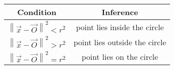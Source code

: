 \providecommand{\norm}[1]{\left\lVert#1\right\rVert}

\begin{tabular}[]{|c|c|}
\hline
Condition	&Inference		\\\hline
$\norm{\vec{x}-\vec{O}}^2<r^2$	&point lies inside the circle \\ \hline
$\norm{\vec{x}-\vec{O}}^2>r^2$	&point lies outside the circle \\ \hline
$\norm{\vec{x}-\vec{O}}^2=r^2$	&point lies on the circle \\ \hline	
\end{tabular}
